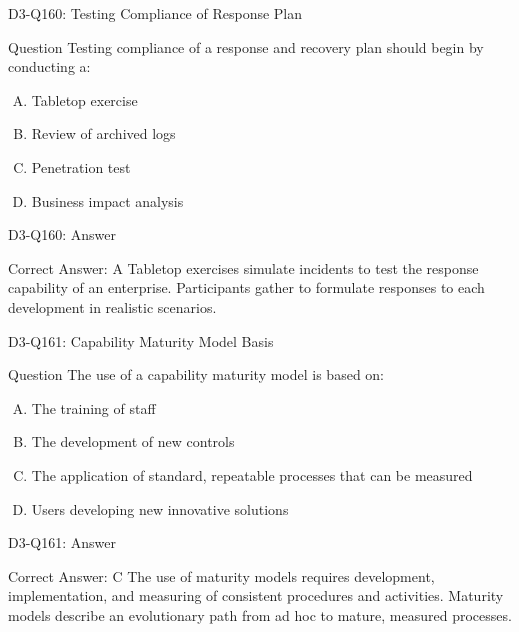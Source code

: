 \documentclass{beamer}
\begin{document}
	\begin{frame}{D3-Q160: Testing Compliance of Response Plan}
		\begin{block}{Question}
			Testing compliance of a response and recovery plan should begin by conducting a:
		\end{block}
		\begin{enumerate}[(A)]
			\item Tabletop exercise
			\item Review of archived logs
			\item Penetration test
			\item Business impact analysis
		\end{enumerate}
	\end{frame}
	\begin{frame}{D3-Q160: Answer}
		\begin{block}{Correct Answer: A}
			Tabletop exercises simulate incidents to test the response capability of an enterprise. Participants gather to formulate responses to each development in realistic scenarios.
		\end{block}
	\end{frame}
	
	\begin{frame}{D3-Q161: Capability Maturity Model Basis}
		\begin{block}{Question}
			The use of a capability maturity model is based on:
		\end{block}
		\begin{enumerate}[(A)]
			\item The training of staff
			\item The development of new controls
			\item The application of standard, repeatable processes that can be measured
			\item Users developing new innovative solutions
		\end{enumerate}
	\end{frame}
	\begin{frame}{D3-Q161: Answer}
		\begin{block}{Correct Answer: C}
			The use of maturity models requires development, implementation, and measuring of consistent procedures and activities. Maturity models describe an evolutionary path from ad hoc to mature, measured processes.
		\end{block}
	\end{frame}
	
\end{document}
